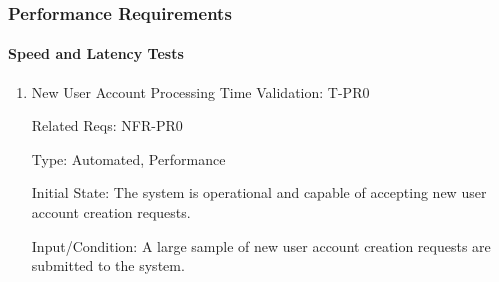 \documentclass[12pt, titlepage]{article}
\begin{document}
\subsubsection{Performance Requirements}
\paragraph{Speed and Latency Tests}
\begin{enumerate}
\item{New User Account Processing Time Validation: T-PR0\\}

Related Reqs: NFR-PR0

Type: Automated, Performance

Initial State: The system is operational and capable of accepting new user account creation requests.

Input/Condition: A large sample of new user account creation requests are submitted to the system.


\end{enumerate}
\end{document}
